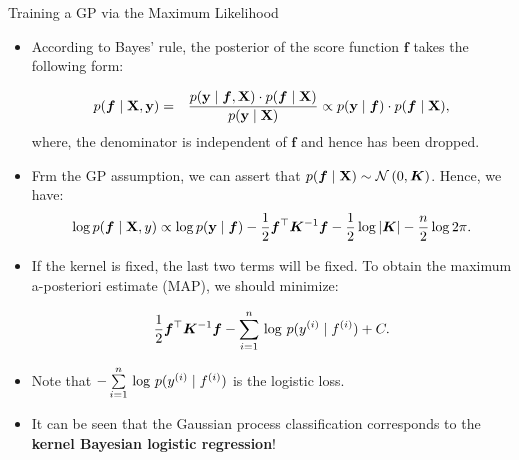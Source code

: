 \begin{frame}[c,allowframebreaks]{Training a GP via the Maximum Likelihood}
\begin{itemize}
\item According to Bayes' rule, the posterior of the score function $\bm{f}$ takes the following form:

\vspace{-0.5cm}
\begin{eqnarray*}p(\bm{f}\mid\mathbf{X}, \mathbf{y}) &=&  \frac{p(\mathbf{y}\mid\bm{f}, \mathbf{X}) \cdot p(\bm{f}\mid\mathbf{X})}{p(\mathbf{y}\mid\mathbf{X})} \propto p(\mathbf{y}\mid\bm{f}) \cdot p(\bm{f}\mid\mathbf{X}),\end{eqnarray*}
\vspace{-2mm}
where, the denominator is independent of $\bm{f}$ and hence has been dropped.

\vspace{15mm}

\item Frm the GP assumption, we can assert that $p(\bm{f}\mid\mathbf{X}) \sim \mathcal{N}\left(0, \bm{K}\right)$. Hence, we have:
\vspace{-2mm}
$$\log p(\bm{f}\mid\mathbf{X}, y) \propto \log p(\mathbf{y}\mid\bm{f}) - \frac{1}{2} \bm{f}^\top \bm{K}^{-1} \bm{f} - \frac{1}{2} \log |\bm{K}| - \frac{n}{2} \log 2 \pi.$$

\end{itemize}


\framebreak

\begin{itemize}

\item If the kernel is fixed, the last two terms will be fixed. To obtain the maximum a-posteriori estimate (MAP), we should minimize:

$$\frac{1}{2} \bm{f}^\top \bm{K}^{-1}\bm{f} - \sum\limits_{i=1}^n\, \log\, p(y^{(i)}\mid f^{(i)}) + C.$$

\vspace{0.5cm}
\item Note that $-\sum\limits_{i=1}^n\,\log \,p(y^{(i)}\mid f^{(i)})$ is the logistic loss.

\vspace{0.7cm}
\item It can be seen that the Gaussian process classification corresponds to the \textbf{kernel Bayesian logistic regression}!
\end{itemize}

\end{frame}




